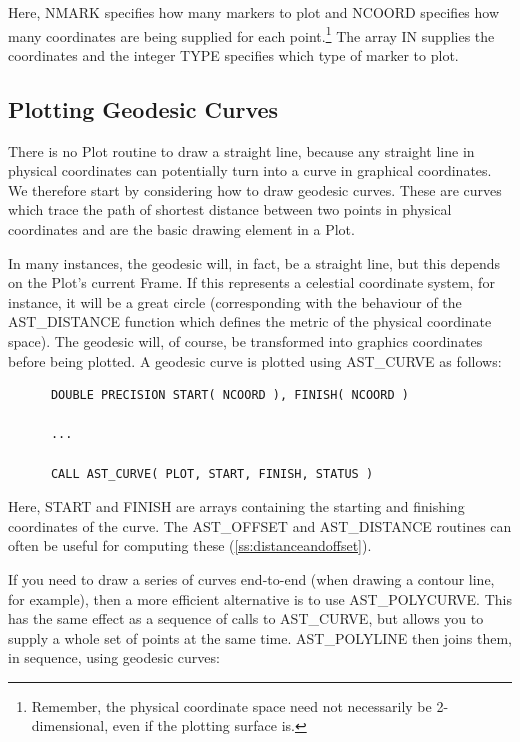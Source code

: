 \documentclass[twoside,11pt]{article}
\newcommand{\htmlref}[2]{#1}
\newcommand{\secref}[1]{\S\ref{#1}}
\renewcommand{\secref}[1]{\ref{#1}}
\begin{document}
Here, NMARK specifies how many markers to plot and NCOORD specifies
how many coordinates are being supplied for each
point.\footnote{Remember, the physical coordinate space need not
necessarily be 2-dimensional, even if the plotting surface is.} The
array IN supplies the coordinates and the integer TYPE specifies which
type of marker to plot.

\subsection{\label{ss:plottinggeodesics}Plotting Geodesic Curves}

There is no \htmlref{Plot}{Plot} routine to draw a straight line, because any straight
line in physical coordinates can potentially turn into a curve in
graphical coordinates. We therefore start by considering how to draw
geodesic curves.  These are curves which trace the path of shortest
distance between two points in physical coordinates
 and are the basic drawing element in a Plot. 

In many instances, the geodesic will, in fact, be a straight line, but
this depends on the Plot's current \htmlref{Frame}{Frame}. If this represents a
celestial coordinate system, for instance, it will be a great circle
(corresponding with the behaviour of the \htmlref{AST\_DISTANCE}{AST_DISTANCE} function which
defines the metric of the physical coordinate space).  The geodesic
will, of course, be transformed into graphics coordinates before being
plotted. A geodesic curve is plotted using \htmlref{AST\_CURVE}{AST_CURVE} as follows:

\small
\begin{verbatim}
      DOUBLE PRECISION START( NCOORD ), FINISH( NCOORD )

      ...

      CALL AST_CURVE( PLOT, START, FINISH, STATUS )
\end{verbatim}
\normalsize

Here, START and FINISH are arrays containing the starting and
finishing coordinates of the curve. The \htmlref{AST\_OFFSET}{AST_OFFSET} and AST\_DISTANCE
routines can often be useful for computing these
(\secref{ss:distanceandoffset}).

If you need to draw a series of curves end-to-end (when drawing a
contour line, for example), then a more efficient alternative is to
use \htmlref{AST\_POLYCURVE}{AST_POLYCURVE}. This has the same effect as a sequence of calls to
AST\_CURVE, but allows you to supply a whole set of points at the same
time. AST\_POLYLINE then joins them, in sequence, using geodesic
curves:
\end{document}
